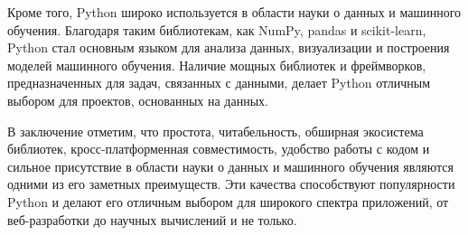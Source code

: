 Кроме того, Python широко используется в области науки о данных и машинного обучения. Благодаря таким библиотекам, как NumPy, pandas и scikit-learn, Python стал основным языком для анализа данных, визуализации и построения моделей машинного обучения. Наличие мощных библиотек и фреймворков, предназначенных для задач, связанных с данными, делает Python отличным выбором для проектов, основанных на данных.

В заключение отметим, что простота, читабельность, обширная экосистема библиотек, кросс-платформенная совместимость, удобство работы с кодом и сильное присутствие в области науки о данных и машинного обучения являются одними из его заметных преимуществ. Эти качества способствуют популярности Python и делают его отличным выбором для широкого спектра приложений, от веб-разработки до научных вычислений и не только.


